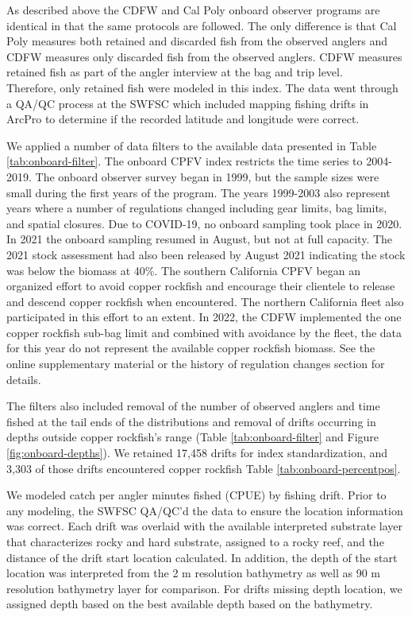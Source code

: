 \documentclass[11pt,
  english,
  letterpaper,
]{article}
\begin{document}
As described above the CDFW and Cal Poly onboard observer programs are identical in that the same protocols are followed. The only difference is that Cal Poly measures both retained and discarded fish from the observed anglers and CDFW measures only discarded fish from the observed anglers. CDFW measures retained fish as part of the angler interview at the bag and trip level.\\
Therefore, only retained fish were modeled in this index. The data went through a QA/QC process at the SWFSC which included mapping fishing drifts in ArcPro to determine if the recorded latitude and longitude were correct.

We applied a number of data filters to the available data presented in Table \ref{tab:onboard-filter}. The onboard CPFV index restricts the time series to 2004-2019. The onboard observer survey began in 1999, but the sample sizes were small during the first years of the program. The years 1999-2003 also represent years where a number of regulations changed including gear limits, bag limits, and spatial closures. Due to COVID-19, no onboard sampling took place in 2020. In 2021 the onboard sampling resumed in August, but not at full capacity. The 2021 stock assessment had also been released by August 2021 indicating the stock was below the biomass at 40\%. The southern California CPFV began an organized effort to avoid copper rockfish and encourage their clientele to release and descend copper rockfish when encountered. The northern California fleet also participated in this effort to an extent. In 2022, the CDFW implemented the one copper rockfish sub-bag limit and combined with avoidance by the fleet, the data for this year do not represent the available copper rockfish biomass. See the online supplementary material or the history of regulation changes section for details.

The filters also included removal of the number of observed anglers and time fished at the tail ends of the distributions and removal of drifts occurring in depths outside copper rockfish's range (Table \ref{tab:onboard-filter} and Figure \ref{fig:onboard-depths}). We retained 17,458 drifts for index standardization, and 3,303 of those drifts encountered copper rockfish Table \ref{tab:onboard-percentpos}.

We modeled catch per angler minutes fished (CPUE) by fishing drift. Prior to any modeling, the SWFSC QA/QC'd the data to ensure the location information was correct. Each drift was overlaid with the available interpreted substrate layer that characterizes rocky and hard substrate, assigned to a rocky reef, and the distance of the drift start location calculated. In addition, the depth of the start location was interpreted from the 2 m resolution bathymetry as well as 90 m resolution bathymetry layer for comparison. For drifts missing depth location, we assigned depth based on the best available depth based on the bathymetry.
\end{document}
